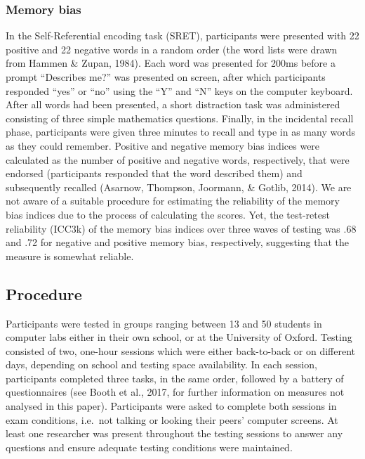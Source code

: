 \documentclass[man,floatsintext]{apa6}
\begin{document}
\hypertarget{memory-bias}{%
\subsubsection{Memory bias}\label{memory-bias}}

In the Self-Referential encoding task (SRET), participants were presented with 22 positive and 22 negative words in a random order (the word lists were drawn from Hammen \& Zupan, 1984). Each word was presented for 200ms before a prompt \enquote{Describes me?} was presented on screen, after which participants responded \enquote{yes} or \enquote{no} using the \enquote{Y} and \enquote{N} keys on the computer keyboard. After all words had been presented, a short distraction task was administered consisting of three simple mathematics questions. Finally, in the incidental recall phase, participants were given three minutes to recall and type in as many words as they could remember. Positive and negative memory bias indices were calculated as the number of positive and negative words, respectively, that were endorsed (participants responded that the word described them) and subsequently recalled (Asarnow, Thompson, Joormann, \& Gotlib, 2014). We are not aware of a suitable procedure for estimating the reliability of the memory bias indices due to the process of calculating the scores. Yet, the test-retest reliability (ICC3k) of the memory bias indices over three waves of testing was .68 and .72 for negative and positive memory bias, respectively, suggesting that the measure is somewhat reliable.

\hypertarget{procedure}{%
\subsection{Procedure}\label{procedure}}

Participants were tested in groups ranging between 13 and 50 students in computer labs either in their own school, or at the University of Oxford. Testing consisted of two, one-hour sessions which were either back-to-back or on different days, depending on school and testing space availability. In each session, participants completed three tasks, in the same order, followed by a battery of questionnaires (see Booth et al., 2017, for further information on measures not analysed in this paper). Participants were asked to complete both sessions in exam conditions, i.e.~not talking or looking their peers' computer screens. At least one researcher was present throughout the testing sessions to answer any questions and ensure adequate testing conditions were maintained.
\end{document}
